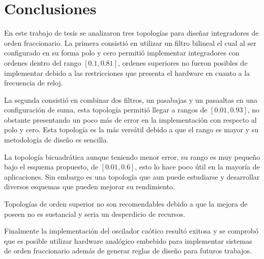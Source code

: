 \chapter{Conclusiones}
	
	En este trabajo de tesis se analizaron tres topologías para diseñar integradores de orden fraccionario. La primera consistió en utilizar un filtro bilineal el cual al ser configurado en su forma polo y cero permitió implementar integradores con ordenes dentro del rango $[0.1, 0.81]$, ordenes superiores  no fueron posibles de implementar debido a las restricciones que presenta el hardware en cuanto a la frecuencia de reloj.
	
	La segunda consistió en combinar dos filtros, un pasabajas y un pasaaltas en una configuración de suma, esta topología permitió llegar a rangos de $[0.01, 0.93]$, no obstante presentando un poco más de error en la implementación con respecto al polo y cero. Esta topología es la más versátil debido a que el rango es mayor y su metodología de diseño es sencilla.
	
	La topología bicuadrática aunque teniendo menor error, su rango es muy pequeño bajo el esquema propuesto, de $[0.01, 0.6]$, esto lo hace poco útil en la mayoría de aplicaciones. Sin embargo es una topología que aun puede estudiarse y desarrollar diversos esquemas que pueden mejorar su rendimiento.
	
	Topologías de orden superior no son recomendables debido a que la mejora de poseen no es sustancial y seria un desperdicio de recursos.
	
	Finalmente la implementación del oscilador caótico resultó exitosa y se comprobó que es posible utilizar hardware analógico embebido para implementar sistemas de orden fraccionario además de generar reglas de diseño para futuros trabajos.